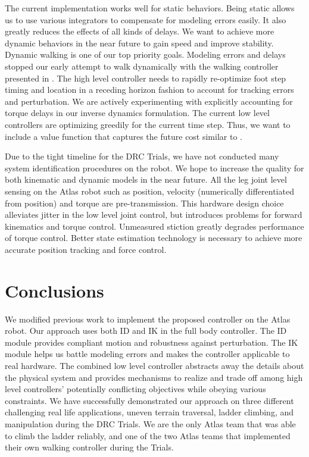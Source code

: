 \documentclass{ws-ijhr}
\begin{document}
The current implementation works well for static behaviors. Being static allows
us to use various integrators to compensate for modeling errors easily. It 
also greatly reduces the effects of all kinds of delays. We want to achieve more
dynamic behaviors in the near future to gain speed and improve stability. Dynamic 
walking is one of our top priority goals. Modeling errors and delays 
stopped our early attempt to walk dynamically with the walking controller 
presented in \cite{sfeng_online}. The high level controller needs to rapidly 
re-optimize foot step timing and location in a receding horizon fashion to 
account for tracking errors and perturbation. We are actively experimenting with 
explicitly accounting for torque delays in our inverse dynamics formulation. 
The current low level controllers are optimizing greedily for the current 
time step. Thus, we want to include a value function that captures the future cost
similar to \cite{scott_qp}. 

Due to the tight timeline for the DRC Trials, we have not conducted many system 
identification procedures on the robot. We hope to increase the quality for 
both kinematic and dynamic models in the near future. All 
the leg joint level sensing on the Atlas robot such as position, velocity 
(numerically differentiated from position) and torque are pre-transmission. 
This hardware design choice alleviates jitter in the low level joint control, 
but introduces problems for forward kinematics and torque control. Unmeasured
stiction greatly degrades performance of torque control. Better state 
estimation technology is necessary to achieve more accurate position tracking 
and force control. 



\section{Conclusions}
We modified previous work to implement the proposed controller on the Atlas 
robot. Our approach uses both ID and IK in the full body controller. The ID 
module provides compliant motion and robustness against perturbation. 
The IK module helps us battle modeling errors and makes the controller 
applicable to real hardware. The combined low level controller 
abstracts away the details about the physical system and provides mechanisms to 
realize and trade off among high level controllers' potentially conflicting 
objectives while obeying various constraints. We have successfully demonstrated 
our approach on three different challenging real life applications, uneven 
terrain traversal, ladder climbing, and manipulation during the DRC Trials. 
We are the only Atlas team that was able to climb the ladder reliably, and one 
of the two Atlas teams that implemented their own walking controller during the
Trials.
 
\end{document}

